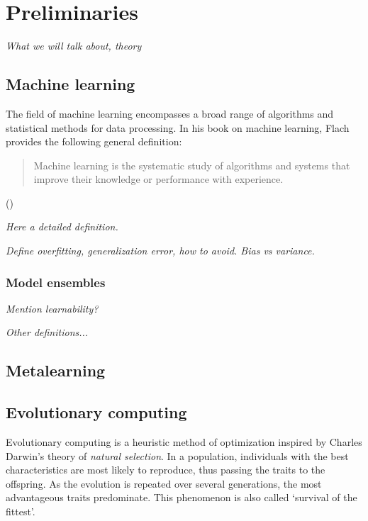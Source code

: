 \chapter{Preliminaries}

\textit{What we will talk about, theory}

\section{Machine learning}
The field of machine learning encompasses a broad range of algorithms and statistical methods for data processing. In his book on machine learning, Flach provides the following general definition:

\blockquote{Machine learning is the systematic study of algorithms and systems that improve their knowledge or performance with experience.} (\cite{Flach:2012:MLA:2490546}) %

\textit{Here a detailed definition.}



\textit{Define overfitting, generalization error, how to avoid. Bias vs variance.}

\subsection{Model ensembles}
\textit{Mention learnability?}

\textit{Other definitions...}

\section{Metalearning}


\section{Evolutionary computing}
Evolutionary computing is a heuristic method of optimization inspired by Charles Darwin's theory of \textit{natural selection}. \cite{darwin} In a population, individuals with the best characteristics are most likely to reproduce, thus passing the traits to the offspring. As the evolution is repeated over several generations, the most advantageous traits predominate. This phenomenon is also called `survival of the fittest'. %

